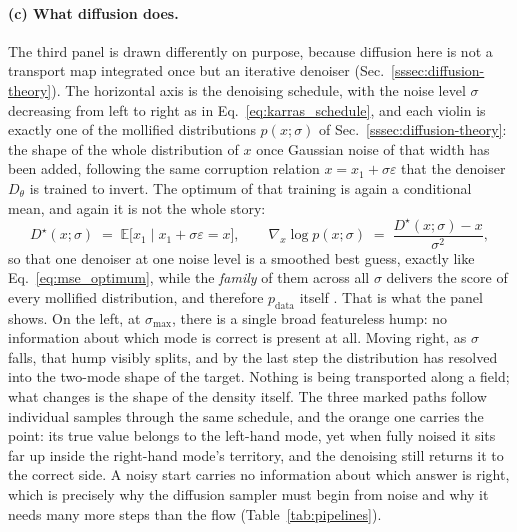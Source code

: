 \documentclass{report}
\begin{document}
\paragraph{(c) What diffusion does.} The third panel is drawn differently on purpose,
because diffusion here is not a transport map integrated once but an iterative denoiser
(Sec.~\ref{sssec:diffusion-theory}). The horizontal axis is the denoising schedule, with the
noise level \mbox{$\sigma$} decreasing from left to right as in Eq.~\eqref{eq:karras_schedule},
and each violin is exactly one of the mollified distributions \mbox{$p(x;\sigma)$} of
Sec.~\ref{sssec:diffusion-theory}: the shape of the whole distribution of \mbox{$x$} once
Gaussian noise of that width has been added, following the same corruption relation
\mbox{$x = x_1 + \sigma\varepsilon$} that the denoiser \mbox{$D_\theta$} is trained to
invert. The optimum of that training is again a conditional mean, and again it is not the
whole story:
\begin{equation}
  D^\star(x;\sigma) \;=\; \mathbb{E}\big[x_1 \;\big|\; x_1 + \sigma\varepsilon = x\big],
  \qquad
  \nabla_{\!x} \log p(x;\sigma) \;=\; \frac{D^\star(x;\sigma) - x}{\sigma^2} ,
  \label{eq:denoiser_score}
\end{equation}
so that one denoiser at one noise level is a smoothed best guess, exactly like
Eq.~\eqref{eq:mse_optimum}, while the \emph{family} of them across all \mbox{$\sigma$}
delivers the score of every mollified distribution, and therefore
\mbox{$p_{\mathrm{data}}$} itself \cite{karras_elucidating_2022}. That is what the panel
shows. On the left, at \mbox{$\sigma_{\max}$}, there is a single broad featureless hump: no
information about which mode is correct is present at all. Moving right, as \mbox{$\sigma$}
falls, that hump visibly splits, and by the last step the distribution has resolved into the
two-mode shape of the target. Nothing is being transported along a field; what changes is
the shape of the density itself. The three marked paths follow individual samples through
the same schedule, and the orange one carries the point: its true value belongs to the
left-hand mode, yet when fully noised it sits far up inside the right-hand mode's
territory, and the denoising still returns it to the correct side. A noisy start carries no
information about which answer is right, which is precisely why the diffusion sampler must
begin from noise and why it needs many more steps than the flow (Table~\ref{tab:pipelines}).
\end{document}

